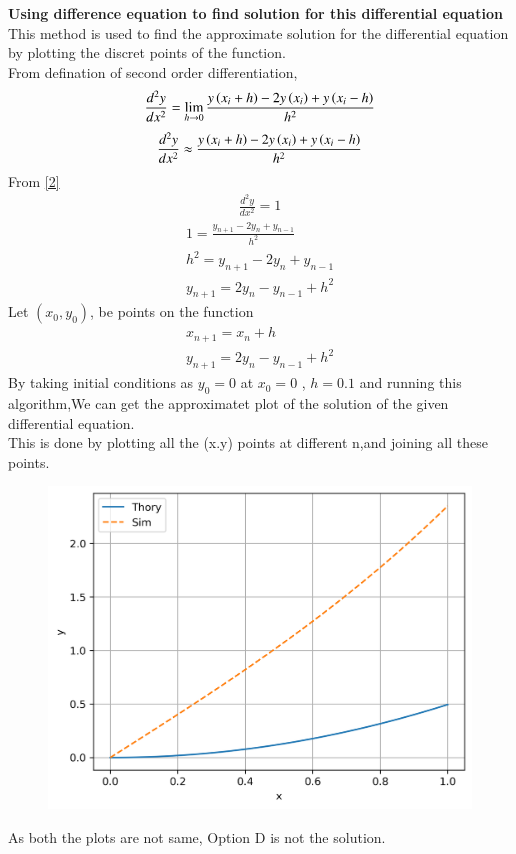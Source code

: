 \documentclass[journal]{IEEEtran}
\begin{document}
\textbf{Using difference equation to find solution for this differential equation}
This method is used to find the approximate solution for the differential equation by plotting the discret points of the function.\\
From defination of second order differentiation,
\begin{align}
\frac{d^2y}{dx^2} = \lim\limits_{h \to 0} \frac{y\left(x_i+h\right)-2y\left(x_i\right)+y\left(x_i-h\right)}{h^2}
\end{align}
\begin{align}
\frac{d^2y}{dx^2} \approx \frac{y\left(x_i+h\right)-2y\left(x_i\right)+y\left(x_i-h\right)}{h^2}
\end{align}
From \eqref{2} \\
\begin{align}
\frac{d^2y}{dx^2} = 1 
\end{align}
\begin{align}
1 = \frac{y_{n+1}-2y_n+y_{n-1}}{h^2} \\
h^2 = y_{n+1}-2y_n+y_{n-1} \\
y_{n+1} = 2y_n-y_{n-1}+h^2 
\end{align}
Let $(x_0,y_0)$, be points on the function
\begin{align}
x_{n+1}=x_{n}+h \\
y_{n+1} = 2y_n-y_{n-1}+h^2 
\end{align}
By taking initial conditions as $y_0 = 0$ at $x_0 = 0$ , $h=0.1$ and running this algorithm,We can get the approximatet plot of the solution of the given differential equation.\\
This is done by plotting all the (x.y) points at different n,and joining all these points.

\begin{figure}[h]
    \centering
    \includegraphics[width=\textwidth]{figs/fig.png}
\end{figure}

As both the plots are not same, Option D is not the solution. \\
\end{document}
